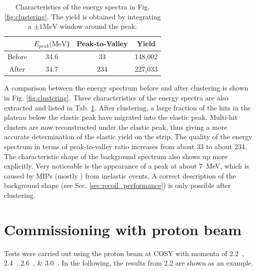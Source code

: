 \documentclass[number,5p]{elsarticle}
\begin{document}
\begin{table}[h!]
  \centering
  \caption{Characteristics of the energy spectra in Fig.
    \ref{fig:clustering}. The yield is obtained by integrating a $\pm 1\si{\MeV}$ window around the peak.}
  \label{tab:clustering}
  \begin{tabular}{cccc}
    \hline
    & $E_{peak}(\si{\MeV}$) & Peak-to-Valley & Yield \\
    \hline
    Before & 34.6 & 33  & 148,002 \\
    After  & 34.7 & 234 & 227,033 \\
    \hline
  \end{tabular}
\end{table}
A comparison between the energy spectrum before and after clustering is shown in Fig. \ref{fig:clustering}.
Three characteristics of the energy spectra are also extracted and listed in Tab. \ref{tab:clustering}.
After clustering, a large fraction of the hits in the plateau below the elastic
peak have migrated into the elastic peak.
Multi-hit clusters are now reconstructed under the elastic peak, thus
giving a more accurate determination of the elastic yield on the strip.
The quality of the energy spectrum in terms of peak-to-valley ratio increases from about 33 to about 234.
The characteristic shape of the background spectrum also shows up more explicitly.
Very noticeable is the appearance of a peak at about \SI{7}{\MeV},
which is caused by MIPs (mostly \Pgppm) from inelastic events.
A correct description of the background shape (see Sec.
\ref{sec:recoil_performance}) is only possible after clustering.

\section{Commissioning with proton beam}
\label{sec:result}

Tests were carried out using the proton beam at COSY with momenta of
\SIlist[list-units=single]{2.2;2.4;2.6;3.0}{\momentum}.
In the following, the results from \SI{2.2}{\momentum} are shown as an example.
\end{document}

